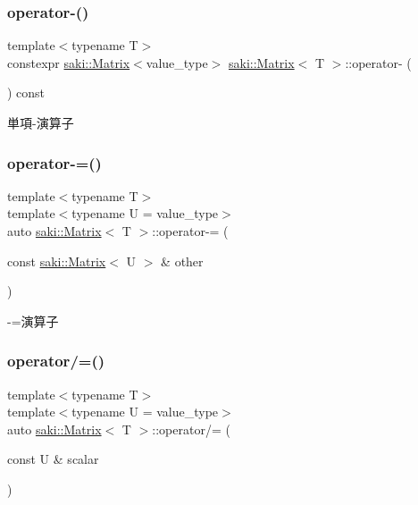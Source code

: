 \subsubsection{\texorpdfstring{operator-\/()}{operator-()}}
{\footnotesize\ttfamily template$<$typename T$>$ \\
constexpr \mbox{\hyperlink{classsaki_1_1_matrix}{saki\+::\+Matrix}}$<$value\+\_\+type$>$ \mbox{\hyperlink{classsaki_1_1_matrix}{saki\+::\+Matrix}}$<$ T $>$\+::operator-\/ (\begin{DoxyParamCaption}{ }\end{DoxyParamCaption}) const\hspace{0.3cm}{\ttfamily [inline]}}



単項-\/演算子 

\mbox{\label{classsaki_1_1_matrix_a1cd8758e3e4d8eb58cee148e71cbed45}} 
\subsubsection{\texorpdfstring{operator-\/=()}{operator-=()}}
{\footnotesize\ttfamily template$<$typename T$>$ \\
template$<$typename U  = value\+\_\+type$>$ \\
auto \mbox{\hyperlink{classsaki_1_1_matrix}{saki\+::\+Matrix}}$<$ T $>$\+::operator-\/= (\begin{DoxyParamCaption}\item[{const \mbox{\hyperlink{classsaki_1_1_matrix}{saki\+::\+Matrix}}$<$ U $>$ \&}]{other }\end{DoxyParamCaption})\hspace{0.3cm}{\ttfamily [inline]}}



-\/=演算子 

\mbox{\label{classsaki_1_1_matrix_a12f386d5595d02c11a8a7af642183c6c}} 
\subsubsection{\texorpdfstring{operator/=()}{operator/=()}}
{\footnotesize\ttfamily template$<$typename T$>$ \\
template$<$typename U  = value\+\_\+type$>$ \\
auto \mbox{\hyperlink{classsaki_1_1_matrix}{saki\+::\+Matrix}}$<$ T $>$\+::operator/= (\begin{DoxyParamCaption}\item[{const U \&}]{scalar }\end{DoxyParamCaption})\hspace{0.3cm}{\ttfamily [inline]}}



